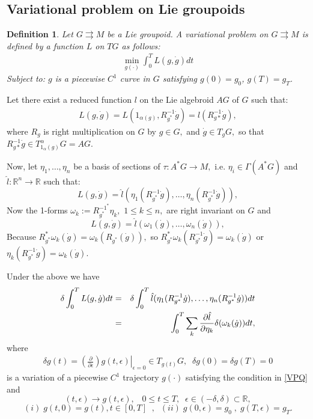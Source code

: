 \documentclass{article}
\newtheorem{definition}[theorem]{Definition}
\begin{document}
\subsection{Variational problem on Lie groupoids}

\begin{definition}
Let $G\rightrightarrows M$ be a Lie groupoid. A variational problem on $G \rightrightarrows M$ is defined by a function $L$ on $TG$ as follows:
\begin{eqnarray}\label{VPQ}
\min_{g(\cdot)}\int^T_0L(g, \dot{g})dt
\end{eqnarray}
Subject to: $g$ is a piecewise $C^1$ curve in $G$ satisfying $g(0)=g_0$, $g(T)=g_T$.
\end{definition}

Let there exist a reduced function $l$ on the Lie algebroid $AG$ of $G$ such that:
\begin{eqnarray}
L(g, \dot{g})=L(1_{\alpha(g)}, R^{-1}_{g^*}\dot{g})=l(R^{-1}_{g*}\dot{g}),
\end{eqnarray}
where $R_g$ is right multiplication on $G$ by $g\in G,$ and $\dot{g}\in T_gG,$ so that $R^{-1}_{g*}\dot{g} \in T^\alpha_{1_\alpha(g)}G = AG.$

Now, let $\eta_1, \ldots, \eta_n$ be a basis of sections of $\tau: A^*G\to M,$ i.e. $\eta_i\in \Gamma(A^*G)$ and $\hat{l}: \mathbb{R}^n\to \mathbb{R}$ such that:
\begin{equation}
L(g, \dot{g})= \hat{l}(\eta_1(R^{-1}_{g^*}\dot{g}), \ldots , \eta_n(R^{-1}_{g^*}\dot{g})),
\end{equation}
Now the 1-forms $\omega_k:=R^{-1^*}_{g^*}\eta_k,$ $1\leq k\leq n,$ are right invariant on $G$ and
\begin{equation}
L(g, \dot{g})= \hat{l}(\omega_1(\dot{g}), \ldots , \omega_n(\dot{g})),
\end{equation} 
Because $R_{g^*}^*\omega_k(\dot{g})=\omega_k(R_{g^*}(\dot{g})),$ so $R_{g^*}^*\omega_k(R^{-1}_{g^*}\dot{g})=\omega_k(\dot{g})$ or $\eta_k(R^{-1}_{g^*}\dot{g})=\omega_k(\dot{g}).$

Under the above we have 
\begin{eqnarray}{\label{DI}}
\delta \int^T_0L(g, \dot{g})dt&=&\delta \int^T_0\hat{l}(\eta_1(R^{-1}_{g^*}\dot{g}), \ldots , \eta_n(R^{-1}_{g^*}\dot{g}))dt\\
&=&\int^T_0\sum_k\frac{\partial\hat{l}}{\partial{\eta_k}}\delta(\omega_k(\dot{g}))dt\nonumber,
\end{eqnarray}
where
\begin{eqnarray}
 \delta g(t) = \left.\left(\frac{\partial}{\partial \epsilon}\right)g(t, \epsilon)\right|_{\epsilon=0}\in T_{g(t)} G,\;\; \delta g(0) =\delta g(T) =0
\end{eqnarray}
is a variation of a piecewise $C^1$ trajectory $g(\cdot)$ satisfying the condition in \ref{VPQ} and
$$ (t, \epsilon) \to g(t, \epsilon), \;\;\; 0\leq t \leq T, \;\; \epsilon \in (-\delta, \delta)\subset \mathbb{R},$$
$$(i) \;g(t, 0) = g(t), t \in [0, T]\;\; , \;\; (ii) \; g(0, \epsilon) = g_0\; , \; g(T, \epsilon) = g_T.$$
\end{document}
